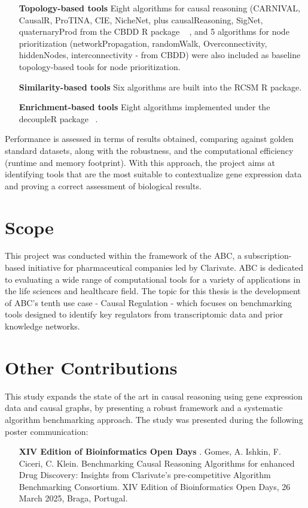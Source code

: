 \begin{enumerate}
\item[\textbf{Topology-based tools}] Eight algorithms for causal reasoning (\gls{CARNIVAL}, CausalR, ProTINA, \gls{CIE}, NicheNet, plus causalReasoning, SigNet, quaternaryProd from the \gls{CBDD} \gls{R} package ~\cite{RN36} , and 5 algorithms for node prioritization (networkPropagation, randomWalk, Overconnectivity, hiddenNodes, interconnectivity - from \gls{CBDD}) were also included as baseline topology-based tools for node prioritization. 
\item[\textbf{Similarity-based tools }] Six algorithms are built into the \gls{RCSM} R package.
\item[\textbf{Enrichment-based tools}] Eight algorithms implemented under the decoupleR package ~\cite{RN35}.
\end{enumerate}

Performance is assessed in terms of results obtained, comparing against golden standard datasets, along with the robustness, and the computational efficiency (runtime and memory footprint). 
With this approach, the project aims at identifying tools that are the most suitable to contextualize gene expression data and proving a correct assessment of biological results.

\section{Scope} %
\label{sec:scope}
This project was conducted within the framework of the \gls{ABC}, a subscription-based initiative for pharmaceutical companies led by Clarivate. \gls{ABC} is dedicated to evaluating a wide range of computational tools for a variety of applications in the life sciences and healthcare field. The topic for this thesis is the development of \gls{ABC}'s tenth use case - Causal Regulation - which focuses on benchmarking tools designed to identify key regulators from transcriptomic data and prior knowledge networks.

\section{Other Contributions} %
\label{sec:other_contributions}

This study expands the state of the art in causal reasoning using gene expression data and causal graphs, by presenting a robust framework and a systematic algorithm benchmarking approach. The study was presented during the following poster communication:
\begin{enumerate}
\item[\textbf{XIV Edition of Bioinformatics Open Days}] . Gomes, A. Ishkin, F. Ciceri, C. Klein. Benchmarking Causal Reasoning Algorithms for enhanced Drug Discovery: Insights from Clarivate's pre-competitive Algorithm Benchmarking Consortium. XIV Edition of Bioinformatics Open Days, 26 March 2025, Braga, Portugal.
\end{enumerate}

